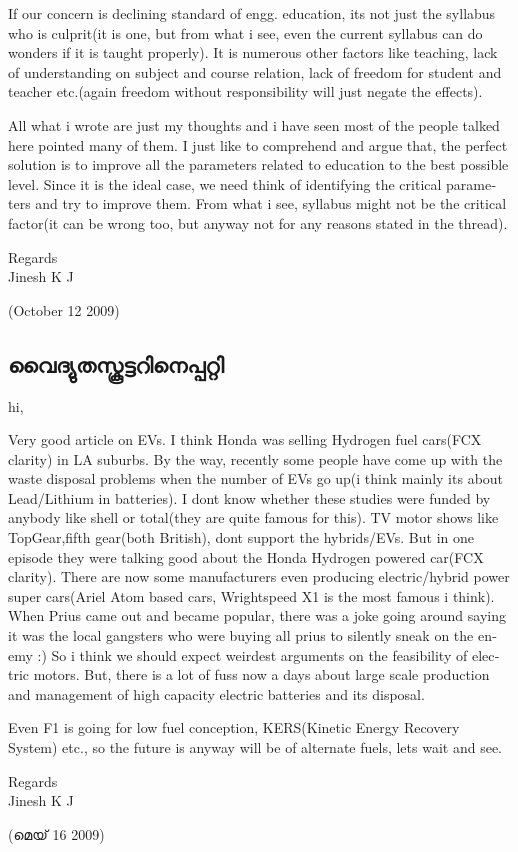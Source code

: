 \begin{english}
If our concern is declining standard of engg. education, its not just the syllabus who is culprit(it is one, but from what i see, even the current syllabus can do wonders if it is taught properly). It is numerous other factors like teaching, lack of understanding on subject and course relation, lack of freedom for student and teacher etc.(again freedom without responsibility will just negate the effects).

All what i wrote are just my thoughts and i have seen most of the people talked here pointed many of them. I just like to comprehend and argue that, the perfect solution is to improve all the parameters related to education to the best possible level. Since it is the ideal case, we need think of identifying the critical parameters and try to improve them. From what i see, syllabus might not be the critical factor(it can be wrong too, but anyway not for any reasons stated in the thread).


Regards\\
Jinesh K J

\begin{flushright}(October 12 2009)\end{flushright}

\end{english}

\subsection*{വൈദ്യുതസ്കൂട്ടറിനെപ്പറ്റി}

\begin{english}
hi,

Very good article on EVs. I think Honda was selling Hydrogen fuel
cars(FCX clarity) in LA suburbs.
By the way, recently some people have come up with the waste disposal
problems when the number of EVs go up(i think mainly its about
Lead/Lithium in batteries). I dont know whether these studies were
funded by anybody like shell or total(they are quite famous for this).
TV motor shows like TopGear,fifth gear(both British), dont support the
hybrids/EVs. But in one episode they were talking good about the Honda
Hydrogen powered car(FCX clarity). There are now some manufacturers
even producing electric/hybrid power super cars(Ariel Atom based cars,
Wrightspeed X1 is the most famous i think). When Prius came out and
became popular, there was a joke going around saying it was the local
gangsters who were buying all prius to silently sneak on the enemy :)
So i think we should expect weirdest arguments on the feasibility of
electric motors. But, there is a lot of fuss now a days about large
scale production and management of high capacity electric batteries
and its disposal.

Even F1 is going for low fuel conception, KERS(Kinetic Energy Recovery
System) etc., so the future is anyway will be of alternate fuels, lets
wait and see.

Regards\\
Jinesh K J

\begin{flushright}(മെയ് 16 2009)\end{flushright}
\end{english}

